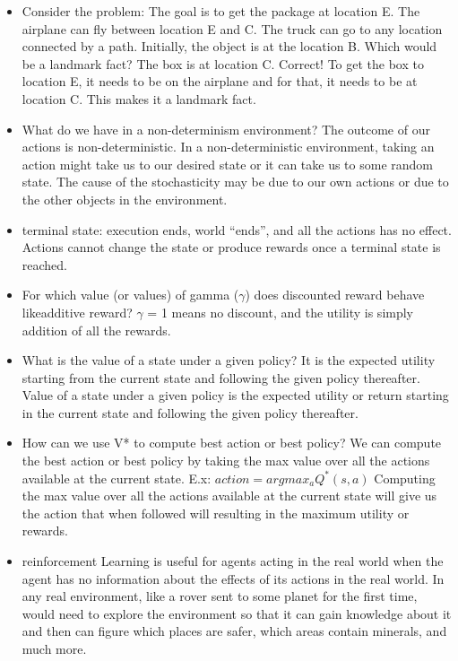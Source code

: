 \documentclass[10pt]{article}
\begin{document}
\begin{itemize}[label=\(\star\), leftmargin=1em, itemsep=-0.3em]
    \item Consider the problem: The goal is to get the package at location E. The airplane can fly between location E and C. The truck can go to any location connected by a path. Initially, the object is at the location B. Which would be a landmark fact?  The box is at location C. Correct! To get the box to location E, it needs to be on the airplane and for that, it needs to be at location C. This makes it a landmark fact.

    \item What do we have in a non-determinism environment? The outcome of our actions is non-deterministic. In a non-deterministic environment, taking an action might take us to our desired state or it can take us to some random state. The cause of the stochasticity may be due to our own actions or due to the other objects in the environment.

    \item terminal state: execution ends, world “ends”, and all the actions has no effect. Actions cannot change the state or produce rewards once a terminal state is reached.

    \item For which value (or values) of gamma ($\gamma$) does discounted reward behave likeadditive reward? $\gamma$ = 1 means no discount, and the utility is simply addition of all the rewards.

    \item What is the value of a state under a given policy?  It is the expected utility starting from the current state and following the given policy thereafter.  Value of a state under a given policy is the expected utility or return starting in the current state and following the given policy thereafter.

    \item How can we use V* to compute best action or best policy? We can compute the best action or best policy by taking the max value over all the actions available at the current state. E.x: $action = argmax_a Q^*(s,a)$ Computing the max value over all the actions available at the current state will give us the action that when followed will resulting in the maximum utility or rewards.



    \item reinforcement Learning is  useful for agents acting in the real world when the agent has no information about the effects of its actions in the real world. In any real environment, like a rover sent to some planet for the first time, would need to explore the environment so that it can gain knowledge about it and then can figure which places are safer, which areas contain minerals, and much more.



\end{itemize}
\end{document}
